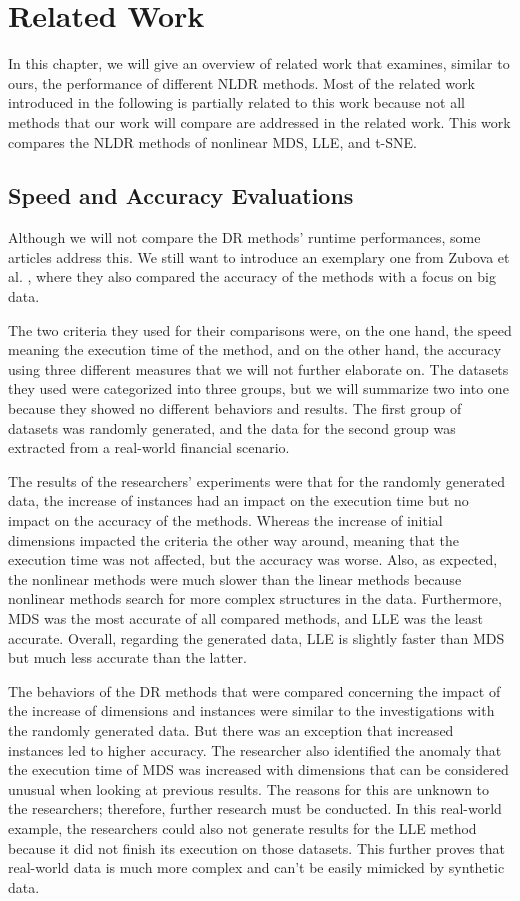 \chapter{Related Work} \label{ch:related_work}

In this chapter, we will give an overview of related work that examines, similar to ours, the performance of different NLDR methods. Most of the related work introduced in the following is partially related to this work because not all methods that our work will compare are addressed in the related work. This work compares the NLDR methods of nonlinear MDS, LLE, and t-SNE.

\section{Speed and Accuracy Evaluations} \label{sec:speed_and_accuracy}

Although we will not compare the DR methods' runtime performances, some articles address this. We still want to introduce an exemplary one from Zubova et al. \cite{Zubova18}, where they also compared the accuracy of the methods with a focus on big data.

The two criteria they used for their comparisons were, on the one hand, the speed meaning the execution time of the method, and on the other hand, the accuracy using three different measures that we will not further elaborate on. The datasets they used were categorized into three groups, but we will summarize two into one because they showed no different behaviors and results. The first group of datasets was randomly generated, and the data for the second group was extracted from a real-world financial scenario.

The results of the researchers' experiments were that for the randomly generated data, the increase of instances had an impact on the execution time but no impact on the accuracy of the methods. Whereas the increase of initial dimensions impacted the criteria the other way around, meaning that the execution time was not affected, but the accuracy was worse. Also, as expected, the nonlinear methods were much slower than the linear methods because nonlinear methods search for more complex structures in the data. Furthermore, MDS was the most accurate of all compared methods, and LLE was the least accurate. Overall, regarding the generated data, LLE is slightly faster than MDS but much less accurate than the latter.

The behaviors of the DR methods that were compared concerning the impact of the increase of dimensions and instances were similar to the investigations with the randomly generated data. But there was an exception that increased instances led to higher accuracy. The researcher also identified the anomaly that the execution time of MDS was increased with dimensions that can be considered unusual when looking at previous results. The reasons for this are unknown to the researchers; therefore, further research must be conducted. In this real-world example, the researchers could also not generate results for the LLE method because it did not finish its execution on those datasets. This further proves that real-world data is much more complex and can't be easily mimicked by synthetic data.

